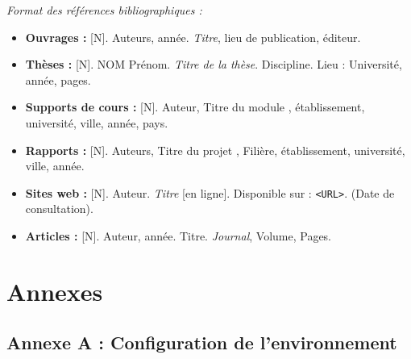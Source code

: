 \documentclass[12pt, a4paper, oneside]{report}
\begin{document}





\printbibliography[heading=bibintoc, title={Bibliographie}]

\vspace{1cm}
\noindent\textcolor{iacsGray}{\small\textit{Format des références bibliographiques :}}

\begin{itemize}[leftmargin=1.5em, itemsep=2pt, label=\textcolor{iacsPrimary}{\textbullet}]
  \item \textbf{Ouvrages :}
    {[N]}. Auteurs, année. \textit{Titre}, lieu de publication, éditeur.

  \item \textbf{Thèses :}
    {[N]}. NOM Prénom. \textit{Titre de la thèse}. Discipline. Lieu : Université, année, pages.

  \item \textbf{Supports de cours :}
    {[N]}. Auteur, \og Titre du module \fg{}, établissement, université, ville, année, pays.

  \item \textbf{Rapports :}
    {[N]}. Auteurs, \og Titre du projet \fg{}, Filière, établissement, université, ville, année.

  \item \textbf{Sites web :}
    {[N]}. Auteur. \textit{Titre} [en ligne]. Disponible sur : \texttt{<URL>}. (Date de consultation).

  \item \textbf{Articles :}
    {[N]}. Auteur, année. Titre. \textit{Journal}, Volume, Pages.
\end{itemize}


\appendix

\chapter*{Annexes}

\section*{Annexe A : Configuration de l'environnement}
\end{document}
